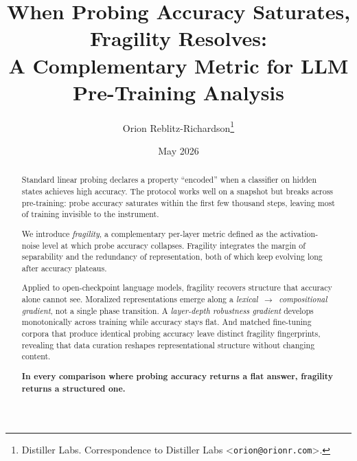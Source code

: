 \documentclass{article}
\title{When Probing Accuracy Saturates, Fragility Resolves:\\
  A Complementary Metric for LLM Pre-Training Analysis}
\author{%
  Orion Reblitz-Richardson\thanks{%
    Distiller Labs. Correspondence to Distiller Labs
    \textless\texttt{orion@orionr.com}\textgreater.}
}
\date{May 2026}
\begin{document}
\maketitle

\begin{abstract}
Standard linear probing declares a property ``encoded'' when a
classifier on hidden states achieves high accuracy. The protocol works
well on a snapshot but breaks across pre-training: probe accuracy
saturates within the first few thousand steps, leaving most of
training invisible to the instrument.

We introduce \emph{fragility}, a complementary per-layer metric
defined as the activation-noise level at which probe accuracy
collapses. Fragility integrates the margin of separability and the
redundancy of representation, both of which keep evolving long after
accuracy plateaus.

Applied to open-checkpoint language models, fragility recovers
structure that accuracy alone cannot see. Moralized representations
emerge along a \emph{lexical~$\to$~compositional gradient}, not a
single phase transition. A \emph{layer-depth robustness gradient}
develops monotonically across training while accuracy stays flat. And
matched fine-tuning corpora that produce identical probing accuracy
leave distinct fragility fingerprints, revealing that data curation
reshapes representational structure without changing content.

\textbf{In every comparison where probing accuracy returns a flat
answer, fragility returns a structured one.}
\end{abstract}







\end{document}
